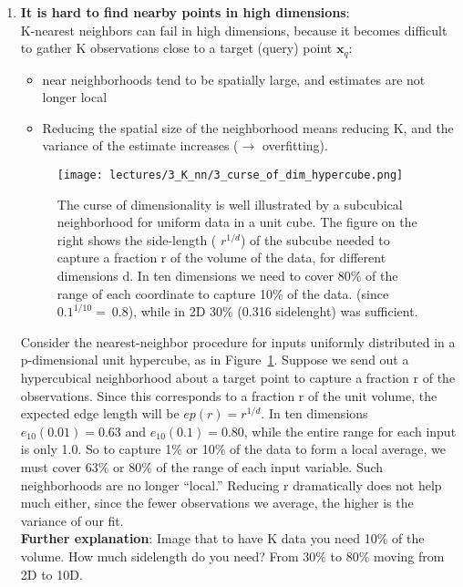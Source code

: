 \documentclass[../main.tex]{subfiles}
\begin{document}
\begin{enumerate}
    \item \textbf{It is hard to find nearby points in high dimensions}:\\
    K-nearest neighbors can fail in high dimensions, because it becomes difficult to gather K observations close to a target (query) point $\mathbf{x}_q$: 
    \begin{itemize}
        \item near neighborhoods tend to be spatially large, and estimates are not longer local
        \item Reducing the spatial size of the neighborhood means reducing K, and the variance of the estimate increases ($\rightarrow$ overfitting).
    \end{itemize}
    
    \begin{figure}
        \centering
        \texttt{[image: lectures/3\_K\_nn/3\_curse\_of\_dim\_hypercube.png]}
        \caption{The curse of dimensionality is well illustrated by a subcubical neighborhood for uniform data in a unit cube. The figure on the right shows the side-length ( $r^{1/d}$) of the subcube needed to capture a fraction r of the volume of the data, for different dimensions d. In ten dimensions we need to cover 80\% of the range of each coordinate to capture 10\% of the data. (since $0.1^{1/10}=~ 0.8$), while in 2D 30\% (0.316 sidelenght) was sufficient.}
        \label{fig:3_curse_of_dim_hypercube}
    \end{figure}
    Consider the nearest-neighbor procedure for inputs uniformly distributed in a p-dimensional unit hypercube, as in Figure~\ref{fig:3_curse_of_dim_hypercube}. Suppose we send out a hypercubical neighborhood about a target point to capture a fraction r of the observations. Since this corresponds to a fraction r of the unit volume, the expected edge length will be $ep(r) = r^{1/d}$. In ten dimensions $e_{10}(0.01) = 0.63$ and $e_{10}(0.1) = 0.80$, while the entire range for each input is only 1.0. So to capture 1\% or 10\% of the data to form a local average, we must cover 63\% or 80\% of the range of each input variable. Such neighborhoods are no longer “local.” Reducing r dramatically does not help much either, since the fewer observations we average, the higher is the variance of our fit.\\
    
    \textbf{Further explanation}:
    Image that to have K data you need 10\% of the volume. How much sidelength do you need? From 30\% to 80\% moving from 2D to 10D.\\
    

\end{enumerate}
\end{document}
